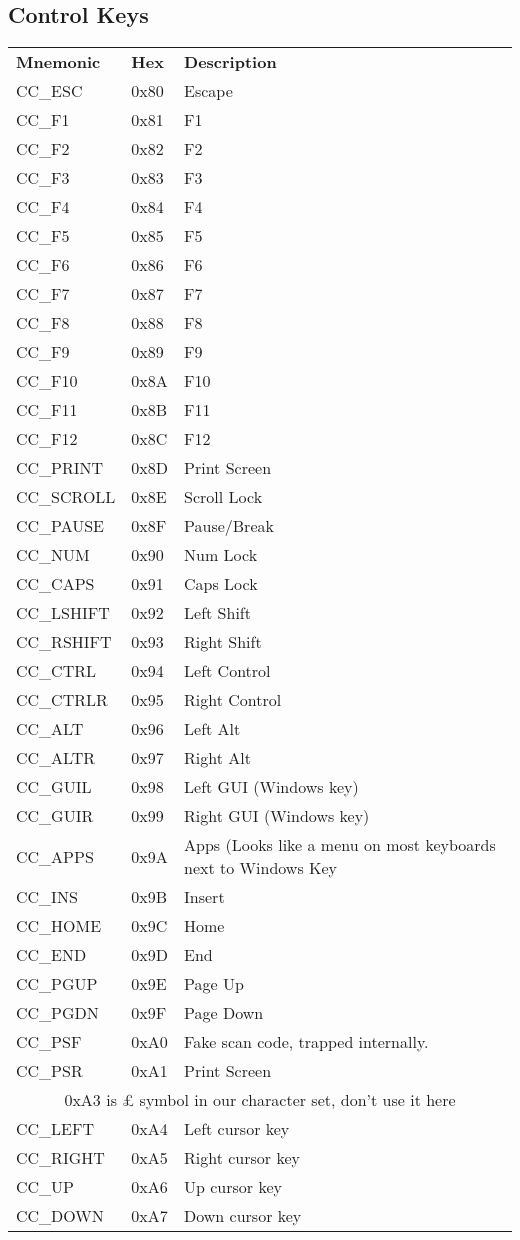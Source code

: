 \subsection{Control Keys}
\begin{tabular}{llp{7cm}}
 \textbf{Mnemonic}&\textbf{Hex}&\textbf{Description}\\
 CC\_ESC&0x80&Escape\\
 CC\_F1&0x81&F1\\
 CC\_F2&0x82&F2\\
 CC\_F3&0x83&F3\\
 CC\_F4&0x84&F4\\
 CC\_F5&0x85&F5\\
 CC\_F6&0x86&F6\\
 CC\_F7&0x87&F7\\
 CC\_F8&0x88&F8\\
 CC\_F9&0x89&F9\\
 CC\_F10&0x8A&F10\\
 CC\_F11&0x8B&F11\\
 CC\_F12&0x8C&F12\\
 CC\_PRINT&0x8D&Print Screen\\
 CC\_SCROLL&0x8E&Scroll Lock\\
 CC\_PAUSE&0x8F&Pause/Break\\
 CC\_NUM&0x90&Num Lock\\
 CC\_CAPS&0x91&Caps Lock\\
 CC\_LSHIFT&0x92&Left Shift\\
 CC\_RSHIFT&0x93&Right Shift\\
 CC\_CTRL&0x94&Left Control\\
 CC\_CTRLR&0x95&Right Control\\
 CC\_ALT&0x96&Left Alt\\
 CC\_ALTR&0x97&Right Alt\\
 CC\_GUIL&0x98&Left GUI (Windows key)\\
 CC\_GUIR&0x99&Right GUI (Windows key)\\
 CC\_APPS&0x9A&Apps (Looks like a menu on most keyboards next to Windows Key\\
 CC\_INS&0x9B&Insert\\
 CC\_HOME&0x9C&Home\\
 CC\_END&0x9D&End\\
 CC\_PGUP&0x9E&Page Up\\
 CC\_PGDN&0x9F&Page Down\\
 CC\_PSF&0xA0&Fake scan code, trapped internally.\\
 CC\_PSR&0xA1&Print Screen\\
 \multicolumn{3}{c}{0xA3 is £ symbol in our character set, don't use it here}\\
 CC\_LEFT&0xA4&Left cursor key\\
 CC\_RIGHT&0xA5&Right cursor key\\
 CC\_UP&0xA6&Up cursor key\\
 CC\_DOWN&0xA7&Down cursor key\\
\end{tabular}

